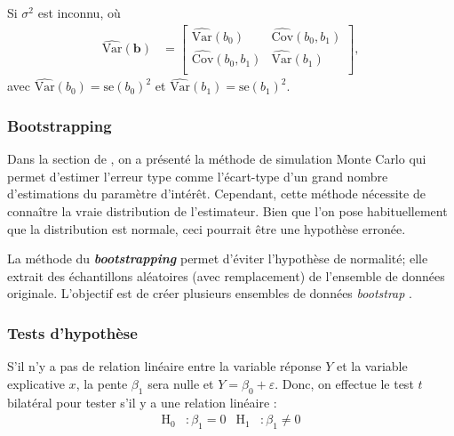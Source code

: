\documentclass[french]{article}
\begin{document}
\begin{multicols*}{2}
\begin{definitionNOHFILL}
\bigskip

Si $\sigma^{2}$ est inconnu,  où 
\begin{align*}
	\widehat{\text{Var}}(\bm{b})
	&=	\begin{bmatrix}
		\widehat{\text{Var}}(b_{0})		&	\widehat{\text{Cov}}(b_{0}, b_{1})	\\
		\widehat{\text{Cov}}(b_{0}, b_{1})	&	\widehat{\text{Var}}(b_{1})		\\
		\end{bmatrix},
\end{align*}
avec $\widehat{\text{Var}}(b_{0}) = \text{se}(b_{0})^{2}$ et $\widehat{\text{Var}}(b_{1}) =\text{se}(b_{1})^{2}$.
\end{definitionNOHFILL}



\columnbreak
\subsubsection{Bootstrapping}
\begin{rappel_enhanced}[Contexte]
Dans la section de \textit{\underline{}}, on a présenté la méthode de simulation Monte Carlo qui permet d'estimer l'erreur type comme l'écart-type d'un grand nombre d'estimations du paramètre d'intérêt. Cependant, cette méthode nécessite de connaître la vraie distribution de l'estimateur. Bien que l'on pose habituellement que la distribution est normale, ceci pourrait être une hypothèse erronée.
\end{rappel_enhanced}

La méthode du \og \textit{\textbf{bootstrapping}} \fg{} permet d'éviter l'hypothèse de normalité; elle extrait des échantillons aléatoires (avec remplacement) de l'ensemble de données originale. L'objectif est de créer plusieurs ensembles de données \og \textit{bootstrap} \fg{}.



\subsubsection{Tests d'hypothèse}
\begin{definitionNOHFILL}
S'il n'y a pas de relation linéaire entre la variable réponse $Y$ et la variable explicative $x$, la pente $\beta_{1}$ sera nulle et $Y = \beta_{0} + \varepsilon$. Donc, on effectue le test $t$ bilatéral pour tester s'il y a une relation linéaire : 
\begin{align*}
	\mathrm{H}_{0}&: \beta_{1} = 0	&
	\mathrm{H}_{1}&: \beta_{1} \neq 0
\end{align*}


\end{definitionNOHFILL}
\end{multicols*}
\end{document}
